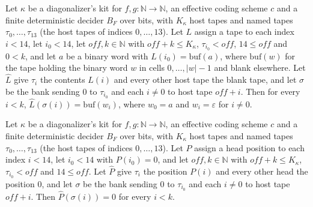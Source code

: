 \begin{theorem}
\label{Turing.NTimeDiag.dz_arg_bank}
\leanok
{}
Let $\kappa$ be a diagonalizer's kit for $f, g : \mathbb{N} \to \mathbb{N}$, an effective coding scheme $c$ and a finite deterministic decider $B_F$ over bits, with $K_\kappa$ host tapes and named tapes $\tau_0, \dots, \tau_{13}$ (the host tapes of indices $0, \dots, 13$). Let $L$ assign a tape to each index $i < 14$, let $i_0 < 14$, let $\mathit{off}, k \in \mathbb{N}$ with $\mathit{off} + k \le K_\kappa$, $\tau_{i_0} < \mathit{off}$, $14 \le \mathit{off}$ and $0 < k$, and let $a$ be a binary word with $L(i_0) = \mathrm{buf}(a)$, where $\mathrm{buf}(w)$ for the tape holding the binary word $w$ in cells $0, \dots, |w| - 1$ and blank elsewhere. Let $\hat L$ give $\tau_i$ the contents $L(i)$ and every other host tape the blank tape, and let $\sigma$ be the bank sending $0$ to $\tau_{i_0}$ and each $i \ne 0$ to host tape $\mathit{off} + i$. Then for every $i < k$, $\hat L(\sigma(i)) = \mathrm{buf}(w_i)$, where $w_0 = a$ and $w_i = \varepsilon$ for $i \ne 0$.
\end{theorem}

\begin{theorem}
\label{Turing.NTimeDiag.dz_zero_bank}
\leanok
{}
Let $\kappa$ be a diagonalizer's kit for $f, g : \mathbb{N} \to \mathbb{N}$, an effective coding scheme $c$ and a finite deterministic decider $B_F$ over bits, with $K_\kappa$ host tapes and named tapes $\tau_0, \dots, \tau_{13}$ (the host tapes of indices $0, \dots, 13$). Let $P$ assign a head position to each index $i < 14$, let $i_0 < 14$ with $P(i_0) = 0$, and let $\mathit{off}, k \in \mathbb{N}$ with $\mathit{off} + k \le K_\kappa$, $\tau_{i_0} < \mathit{off}$ and $14 \le \mathit{off}$. Let $\hat P$ give $\tau_i$ the position $P(i)$ and every other head the position $0$, and let $\sigma$ be the bank sending $0$ to $\tau_{i_0}$ and each $i \ne 0$ to host tape $\mathit{off} + i$. Then $\hat P(\sigma(i)) = 0$ for every $i < k$.
\end{theorem}

